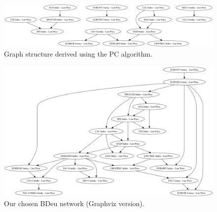 \documentclass[12pt, letterpaper]{article}
\begin{document}
\begin{figure}[ht]
\centering
\includegraphics[width=1\textwidth]{graphics/PC.png}
\caption{Graph structure derived using the PC algorithm.}
\label{fig:netpc}
\end{figure}

\begin{figure}[ht]
\centering
\includegraphics[width=1\textwidth]{graphics/HCBDeu10v5.png}
\caption{Our chosen BDeu network (Graphviz version).}
\label{fig:netbdeu}
\end{figure}
\end{document}
